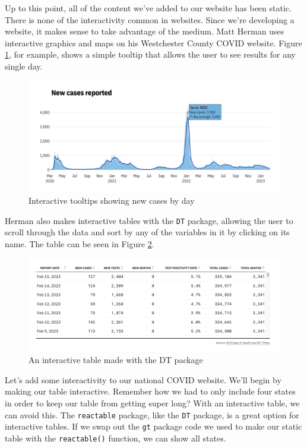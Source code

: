 \documentclass[
]{book}
\begin{document}
Up to this point, all of the content we've added to our website has been static. There is none of the interactivity common in websites. Since we're developing a website, it makes sense to take advantage of the medium. Matt Herman uses interactive graphics and maps on his Westchester County COVID website. Figure \ref{fig:westchester-website-tooltip}, for example, shows a simple tooltip that allows the user to see results for any single day.

\begin{figure}
\includegraphics[width=1\linewidth]{assets/westchester-website-tooltip} \caption{Interactive tooltips showing new cases by day}\label{fig:westchester-website-tooltip}
\end{figure}

Herman also makes interactive tables with the \texttt{DT} package, allowing the user to scroll through the data and sort by any of the variables in it by clicking on its name. The table can be seen in Figure \ref{fig:dt-table}.

\begin{figure}
\includegraphics[width=1\linewidth]{assets/dt-table} \caption{An interactive table made with the DT package}\label{fig:dt-table}
\end{figure}

Let's add some interactivity to our national COVID website. We'll begin by making our table interactive. Remember how we had to only include four states in order to keep our table from getting super long? With an interactive table, we can avoid this. The \texttt{reactable} package, like the \texttt{DT} package, is a great option for interactive tables. If we swap out the \texttt{gt} package code we used to make our static table with the \texttt{reactable()} function, we can show all states.
\end{document}
